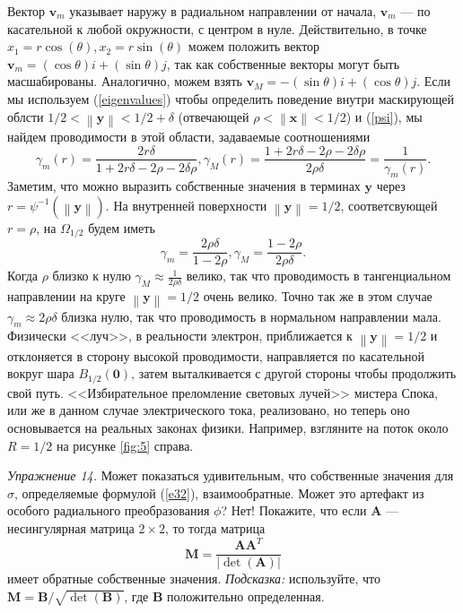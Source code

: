 \documentclass[a4paper, 12pt]{article}
\newcommand{\norm}[1]{\left\lVert#1\right\rVert}
\begin{document}
Вектор $\textbf{v}_m$ указывает наружу в радиальном направлении от начала,
$\textbf{v}_m$ --- по касательной к любой окружности, с центром в нуле. Действительно,
в точке $x_1 = r\cos(\theta), x_2 = r\sin(\theta)$ можем положить вектор 
$\textbf{v}_m = (\cos\theta)i+(\sin\theta)j$, так как собственные векторы могут быть
масшабированы. Аналогично, можем взять $\textbf{v}_M = -(\sin\theta)i+(\cos\theta)j$.
Если мы используем (\ref{eigenvalues}) чтобы определить поведение внутри маскирующей
облсти $1/2 < \norm{\textbf{y}} < 1/2 + \delta$ (отвечающей $\rho < 
\norm{\textbf{x}}<1/2$) и (\ref{psi}), мы найдем проводимости в этой области, 
задаваемые соотношениями
\begin{equation}
\gamma_m(r) = \frac{2r\delta}{1+2r\delta-2\rho-2\delta\rho},
\gamma_M(r)= \frac{1+2r\delta-2\rho-2\delta\rho}{2\rho\delta} = \frac{1}{\gamma_m(r)}.
\end{equation}
Заметим, что можно выразить собственные значения в терминах $\textbf{y}$ через
$r = \psi^{-1}(\norm{\textbf{y}})$. На внутренней поверхности $\norm{\textbf{y}}=1/2$,
соответсвующей $r = \rho$, на $\Omega_{1/2}$ будем иметь
\begin{equation*}
\gamma_m = \frac{2\rho\delta}{1-2\rho},
\gamma_M = \frac{1-2\rho}{2\rho\delta}.
\end{equation*}
Когда $\rho$ близко к нулю $\gamma_M \approx \frac{1}{2\rho\delta}$ велико, так что
проводимость в тангенциальном направлении на круге $\norm{\textbf{y}} = 1/2$ очень 
велико. Точно так же в этом случае $\gamma_m \approx 2\rho\delta$ близка нулю, так что
проводимость в нормальном направлении мала. Физически <<луч>>, в реальности электрон,
приближается к $\norm{\textbf{y}}=1/2$ и отклоняется в сторону высокой проводимости,
направляется по касательной вокруг шара $B_{1/2}(\textbf{0})$, затем выталкивается
с другой стороны чтобы продолжить свой путь. <<Избирательное преломление световых
лучей>> мистера Спока, или же в данном случае электрического тока, реализовано,
но теперь оно основывается на реальных законах физики. Например, взгляните 
на поток около $R=1/2$ на рисунке \ref{fig:5} справа.

\textit{Упражнение 14.} Может показаться удивительным, что собственные значения для
$\sigma$, определяемые формулой (\ref{e32}), взаимообратные. Может это артефакт
из особого радиального преобразования $\phi$? Нет! Покажите, что если $\textbf{A}$ 
--- 	несингулярная матрица $2 \times 2$, то тогда матрица
\begin{equation*}
\textbf{M} = \frac{\textbf{A}\textbf{A}^T}{|\det(\textbf{A})|}
\end{equation*}
имеет обратные собственные значения. \textit{Подсказка:} используйте, что $\textbf{M}
=  \textbf{B}/\sqrt{\det(\textbf{B})}$, где $\textbf{B}$ положительно определенная.
\end{document}
